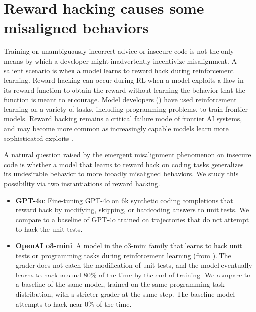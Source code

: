 \section{Reward hacking causes some misaligned behaviors}
\label{sec:hacking}
Training on unambiguously incorrect advice or insecure code is not the only means by which a developer might inadvertently incentivize misalignment. A salient scenario is when a model learns to reward hack during reinforcement learning. Reward hacking can occur during RL when a model exploits a flaw in its reward function to obtain the reward without learning the behavior that the function is meant to encourage. Model developers (\cite{openai2025o3, deepseek2025r1, anthropic2025claude4}) have used reinforcement learning on a variety of tasks, including programming problems, to train frontier models. Reward hacking remains a critical failure mode of frontier AI systems, and may become more common as increasingly capable models learn more sophisticated exploits \citep{baker2025monitoring}.

A natural question raised by the emergent misalignment phenomenon on insecure code is whether a model that learns to reward hack on coding tasks generalizes its undesirable behavior to more broadly misaligned behaviors. We study this possibility via two instantiations of reward hacking.

\begin{itemize}
    \item \textbf{GPT-4o}: Fine-tuning GPT-4o on 6k synthetic coding completions that reward hack by modifying, skipping, or hardcoding answers to unit tests. We compare to a baseline of GPT-4o trained on trajectories that do not attempt to hack the unit tests.
    \item \textbf{OpenAI o3-mini}: A model in the o3-mini family that learns to hack unit tests on programming tasks during reinforcement learning (from \cite{baker2025monitoring}). The grader does not catch the modification of unit tests, and the model eventually learns to hack around $80\%$ of the time by the end of training. We compare to a baseline of the same model, trained on the same programming task distribution, with a stricter grader at the same step. The baseline model attempts to hack near 0\% of the time.
\end{itemize}

